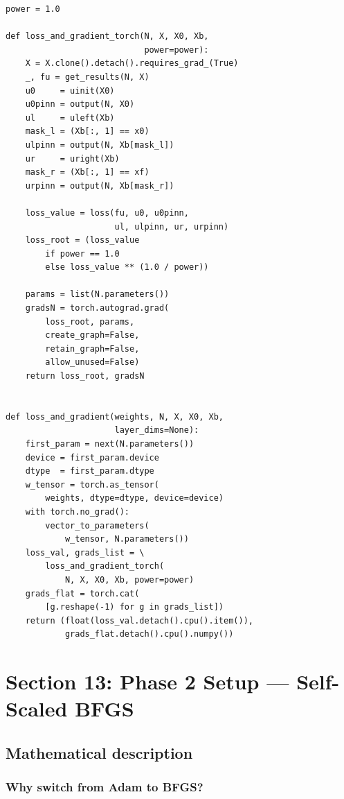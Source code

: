 \documentclass[11pt,a4paper]{article}
\begin{document}
\begin{lstlisting}
power = 1.0

def loss_and_gradient_torch(N, X, X0, Xb,
                            power=power):
    X = X.clone().detach().requires_grad_(True)
    _, fu = get_results(N, X)
    u0     = uinit(X0)
    u0pinn = output(N, X0)
    ul     = uleft(Xb)
    mask_l = (Xb[:, 1] == x0)
    ulpinn = output(N, Xb[mask_l])
    ur     = uright(Xb)
    mask_r = (Xb[:, 1] == xf)
    urpinn = output(N, Xb[mask_r])

    loss_value = loss(fu, u0, u0pinn,
                      ul, ulpinn, ur, urpinn)
    loss_root = (loss_value
        if power == 1.0
        else loss_value ** (1.0 / power))

    params = list(N.parameters())
    gradsN = torch.autograd.grad(
        loss_root, params,
        create_graph=False,
        retain_graph=False,
        allow_unused=False)
    return loss_root, gradsN


def loss_and_gradient(weights, N, X, X0, Xb,
                      layer_dims=None):
    first_param = next(N.parameters())
    device = first_param.device
    dtype  = first_param.dtype
    w_tensor = torch.as_tensor(
        weights, dtype=dtype, device=device)
    with torch.no_grad():
        vector_to_parameters(
            w_tensor, N.parameters())
    loss_val, grads_list = \
        loss_and_gradient_torch(
            N, X, X0, Xb, power=power)
    grads_flat = torch.cat(
        [g.reshape(-1) for g in grads_list])
    return (float(loss_val.detach().cpu().item()),
            grads_flat.detach().cpu().numpy())
\end{lstlisting}


\section{Section 13: Phase 2 Setup --- Self-Scaled BFGS}
\label{sec:bfgs_setup}

\subsection*{Mathematical description}

\subsubsection*{Why switch from Adam to BFGS?}
\end{document}
